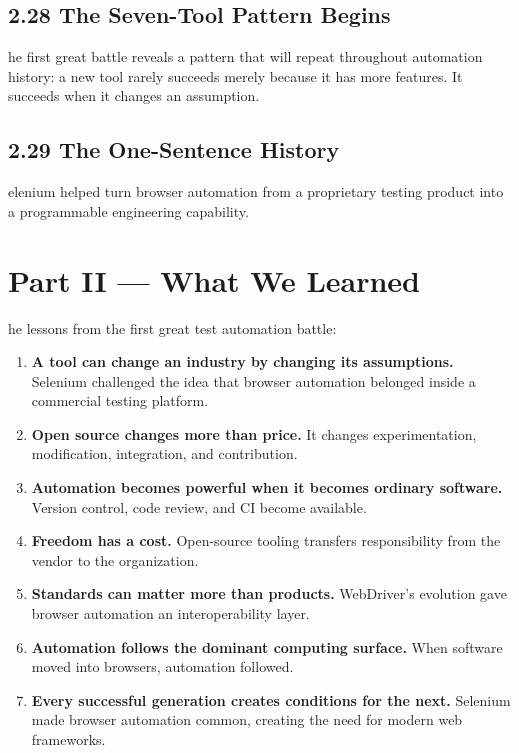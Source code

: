 \documentclass[11pt, a4paper, openany]{book}
\newcommand{\initialcap}[1]{{\fontfamily{lmss}\selectfont\huge\textbf{#1}}}
\begin{document}
\section{2.28 The Seven-Tool Pattern Begins}
\noindent \initialcap{T}he first great battle reveals a pattern that will repeat throughout automation history: a new tool rarely succeeds merely because it has more features. It succeeds when it changes an assumption.

\section{2.29 The One-Sentence History}
\noindent \initialcap{S}elenium helped turn browser automation from a proprietary testing product into a programmable engineering capability.

\chapter*{Part II --- What We Learned}

\noindent \initialcap{T}he lessons from the first great test automation battle:
\begin{enumerate}
    \item \textbf{A tool can change an industry by changing its assumptions.} Selenium challenged the idea that browser automation belonged inside a commercial testing platform.
    \item \textbf{Open source changes more than price.} It changes experimentation, modification, integration, and contribution.
    \item \textbf{Automation becomes powerful when it becomes ordinary software.} Version control, code review, and CI become available.
    \item \textbf{Freedom has a cost.} Open-source tooling transfers responsibility from the vendor to the organization.
    \item \textbf{Standards can matter more than products.} WebDriver's evolution gave browser automation an interoperability layer.
    \item \textbf{Automation follows the dominant computing surface.} When software moved into browsers, automation followed.
    \item \textbf{Every successful generation creates conditions for the next.} Selenium made browser automation common, creating the need for modern web frameworks.
\end{enumerate}
\end{document}
